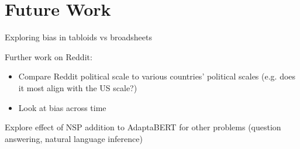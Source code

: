 \section{Future Work}

Exploring bias in tabloids vs broadsheets

Further work on Reddit:
\begin{itemize}
    \item Compare Reddit political scale to various countries' political scales (e.g. does it most align with the US scale?)
    \item Look at bias across time
\end{itemize}

Explore effect of NSP addition to AdaptaBERT for other problems (question answering, natural language inference)

